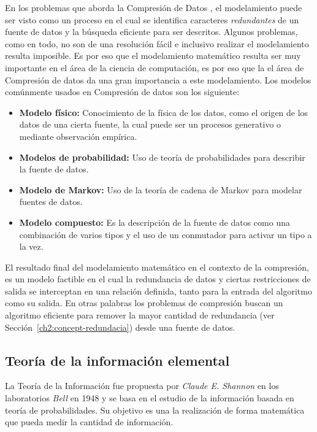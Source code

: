 En los problemas que aborda la Compresión de Datos , el modelamiento puede ser visto como un proceso en el cual se identifica caracteres \emph{redundantes} de un fuente de datos y la búsqueda eficiente para ser descritos. Algunos problemas, como en todo, no son de una resolución fácil e inclusivo realizar el modelamiento resulta imposible. Es por eso que el modelamiento matemático resulta ser muy importante en el área de la ciencia de computación, es por eso que la el área de Compresión de datos da una gran importancia a este modelamiento. Los modelos comúnmente usados en Compresión de datos son los siguiente:
\begin{itemize}
	\menorEspacioItemize
	\item \textbf{Modelo físico:} Conocimiento de la física de los datos, como el origen de los datos de una cierta fuente, la cual puede ser un procesos generativo o mediante observación empírica.
	\item \textbf{Modelos de probabilidad:} Uso de teoría de probabilidades para describir la fuente de datos.
	\item \textbf{Modelo de Markov:} Uso de la teoría de cadena de Markov para modelar fuentes de datos.
	\item \textbf{Modelo compuesto:} Es la descripción de la fuente de datos como una combinación de varios tipos y el uso de un conmutador para activar un tipo a la vez.

\end{itemize}

El resultado final del modelamiento matemático en el contexto de la compresión, es un modelo factible en el cual la redundancia de datos y ciertas restricciones de salida se interceptan en una relación definida, tanto para la entrada del algoritmo como su salida. En otras palabras los problemas de compresión  buscan un algoritmo eficiente para remover la mayor cantidad de redundancia (ver Sección~\ref{ch2:concept-redundacia}) desde una fuente de datos.


 



\uncm
\subsection{Teoría de la información elemental}


La Teoría de la Información fue propuesta por \emph{Claude E. Shannon} en los laboratorios \emph{Bell} en 1948 y se basa en el estudio de la información basada en teoría de probabilidades. Su objetivo es una la realización de forma matemática que pueda medir la cantidad de información.

